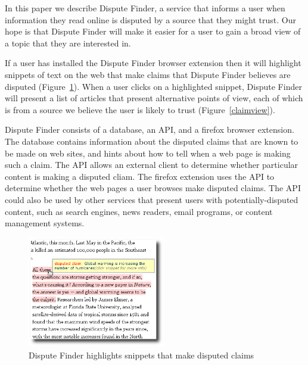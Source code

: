 \documentclass{www2010-submission}
\begin{document}
In this paper we describe Dispute Finder, a service that informs a user when information they read online is disputed by a source that they might trust. Our hope is that Dispute Finder will make it easier for a user to gain a broad view of a topic that they are interested in.

If a user has installed the Dispute Finder browser extension then it will highlight snippets of text on the web that make claims that Dispute Finder believes are disputed (Figure~\ref{highlight}). 
When a user clicks on a highlighted snippet, Dispute Finder will present a list of articles that present alternative points of view, each of which is from a source we believe the user is likely to trust (Figure~\ref{claimview}). 

Dispute Finder consists of a database, an API, and a firefox browser extension. The database contains information about the disputed claims that are known to be made on web sites, and hints about how to tell when a web page is making such a claim. The API allows an external client to determine whether particular content is making a disputed cliam. The firefox extension uses the API to determine whether the web pages a user browses make disputed claims. The API could also be used by other services that present users with potentially-disputed content, such as search engines, news readers, email programs, or content management systems.

\begin{figure}[tb]
	\begin{center}
	\includegraphics[width=6cm]{../screenshots/v2_highlight_shadow.png}
	\caption{Dispute Finder highlights snippets that make disputed claims}
	\label{highlight}
	\end{center}
\end{figure}
\end{document}
